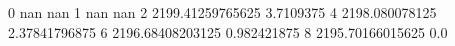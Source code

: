0 nan nan
1 nan nan
2 2199.41259765625 3.7109375
4 2198.080078125 2.37841796875
6 2196.68408203125 0.982421875
8 2195.70166015625 0.0
